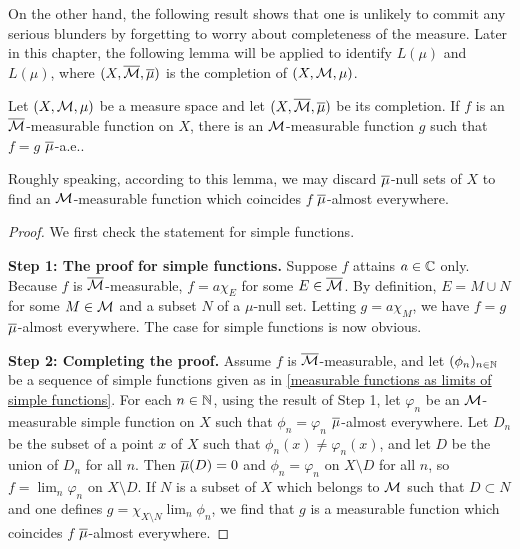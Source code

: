 On the other hand, the following result shows that one is unlikely to commit any serious blunders by forgetting to worry about completeness of the measure.
Later in this chapter, the following lemma will be applied to identify $L(\mu)$ and $L(\mu)$, where $(X, \overline{{\mathcal{M}}}, \overline{\mu})$ is the completion of $(X, {\mathcal{M}}, \mu)$.
\begin{lem}\label{nullities are removable}
    Let $(X, {\mathcal{M}}, \mu)$ be a measure space and let $(X, \overline{{\mathcal{M}}}, \overline{\mu})$ be its completion.
    If $f$ is an $\overline{{\mathcal{M}}}$-measurable function on $X$, there is an ${\mathcal{M}}$-measurable function $g$ such that $f=g$ $\overline{\mu}$-a.e..
\end{lem}
\begin{rmk}
    Roughly speaking, according to this lemma, we may discard $\overline{\mu}$-null sets of $X$ to find an ${\mathcal{M}}$-measurable function which coincides $f$ $\overline{\mu}$-almost everywhere.
\end{rmk}
\begin{proof}
    We first check the statement for simple functions.

    \textbf{Step 1: The proof for simple functions.}\newline\noindent
    Suppose $f$ attains $a\in{\mathbb{C}}$ only.
    Because $f$ is $\overline{{\mathcal{M}}}$-measurable, $f=a\chi_E$ for some $E\in\overline{{\mathcal{M}}}$.
    By definition, $E=M\cup N$ for some $M\in{\mathcal{M}}$ and a subset $N$ of a $\mu$-null set.
    Letting $g=a\chi_M$, we have $f=g$ $\overline{\mu}$-almost everywhere.
    The case for simple functions is now obvious.

    \textbf{Step 2: Completing the proof.}\newline\noindent
    Assume $f$ is $\overline{{\mathcal{M}}}$-measurable, and let $(\phi_n)_{n\in{\mathbb{N}}}$ be a sequence of simple functions given as in \cref{measurable functions as limits of simple functions}.
    For each $n\in{\mathbb{N}}$, using the result of Step 1, let $\varphi_n$ be an ${\mathcal{M}}$-measurable simple function on $X$ such that $\phi_n=\varphi_n$ $\overline{\mu}$-almost everywhere.
    Let $D_n$ be the subset of a point $x$ of $X$ such that $\phi_n(x)\neq\varphi_n(x)$, and let $D$ be the union of $D_n$ for all $n$.
    Then $\overline{\mu}(D)=0$ and $\phi_n=\varphi_n$ on $X\setminus D$ for all $n$, so $f=\lim_n\varphi_n$ on $X\setminus D$.
    If $N$ is a subset of $X$ which belongs to ${\mathcal{M}}$ such that $D\subset N$ and one defines $g=\chi_{X\setminus N}\lim_n\phi_n$, we find that $g$ is a measurable function which coincides $f$ $\overline{\mu}$-almost everywhere.
\end{proof}

